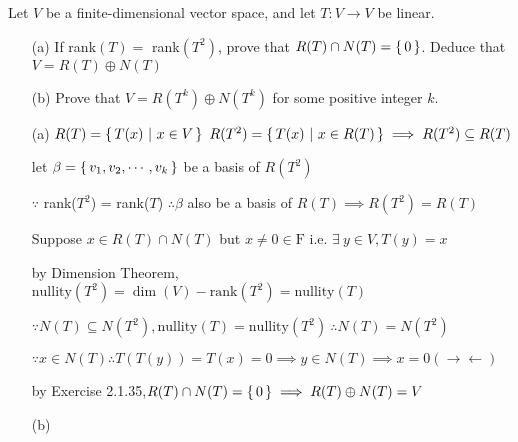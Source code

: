 Let $V$ be a finite-dimensional vector space, and let $T: V \rightarrow V$ be linear.

\begin{enumerate}
	\item[(a)] If rank$(T)=$ rank$(T^2)$, prove that $R(T) \cap N(T) = \left\{ \,0 \,\right\}$. Deduce that $V = R(T) \oplus N(T)$
	\item[(b)] Prove that $V = R(T^k)\oplus N(T^k)$ for some positive integer $k$.
\end{enumerate}

\begin{tcolorbox}

\begin{enumerate}
	\item[(a)] $R(T) = \left\{ \,T(x)~|~x \in V \,\right\}~R(T^2)=\left\{ \,T(x)~|~x\in R(T) \,\right\} \implies R(T^2) \subseteq R(T)$
	
	let $\beta = \left\{ \,v_1,v_2,\cdots,v_k \,\right\}$ be a basis of $R(T^2)$
	
	$\because$ rank($T^2$) = rank($T$) $\therefore \beta$ also be a basis of $R(T) \implies R(T^2) = R(T)$
	
	Suppose $x\in R(T) \cap N(T)$ but $x \neq 0 \in \mathrm{F}$  i.e. $\exists ~y \in V, T(y) = x$
	
	by Dimension Theorem, $\text{nullity}(T^2) = \dim(V) - \text{rank}(T^2) =  \text{nullity}(T)$
	
	$\because N(T) \subseteq N(T^2), \text{nullity}(T) = \text{nullity}(T^2) ~\therefore N(T) = N(T^2)$
	
	$\because x \in N(T) \therefore T(T(y)) = T(x) = 0 \implies y \in N(T) \implies x = 0 (\rightarrow\leftarrow)$
	
	by Exercise 2.1.35,$R(T) \cap N(T) = \left\{ \,0 \,\right\} \implies R(T) \oplus N(T) = V$
	
	\item[(b)] 
\end{enumerate}
	
	
	
\end{tcolorbox}